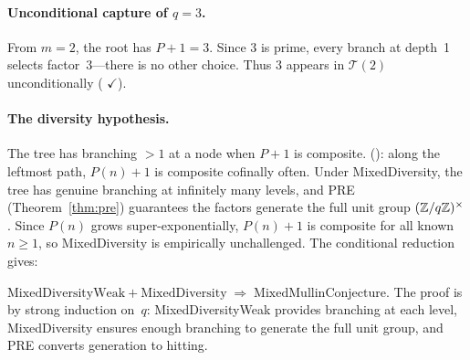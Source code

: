 \paragraph{Unconditional capture of $q = 3$.}
From $m = 2$, the root has $P{+}1 = 3$.  Since $3$ is prime, every
branch at depth~1 selects factor~$3$---there is no other choice.
Thus $3$ appears in $\mathcal{T}(2)$ unconditionally
(
{\color{leanink}$\checkmark$}).

\paragraph{The diversity hypothesis.}
The tree has branching $> 1$ at a node when $P{+}1$ is composite.
():
along the leftmost path, $P(n){+}1$ is composite cofinally often.
Under MixedDiversity, the tree has genuine branching at infinitely
many levels, and PRE (Theorem~\ref{thm:pre}) guarantees the factors
generate the full unit group $(\mathbb{Z}/q\mathbb{Z})^\times$.
Since $P(n)$ grows super-exponentially, $P(n){+}1$ is composite for
all known $n \geq 1$, so MixedDiversity is empirically unchallenged.
The conditional reduction gives:

\begin{theorem}
\label{thm:diversity-mixed-mc}
$\mathrm{MixedDiversityWeak} + \mathrm{MixedDiversity}
\;\Longrightarrow\; \mathrm{MixedMullinConjecture}$.
The proof is by strong induction on~$q$: MixedDiversityWeak provides
branching at each level, MixedDiversity ensures enough branching
to generate the full unit group, and PRE converts generation to hitting.
\end{theorem}

